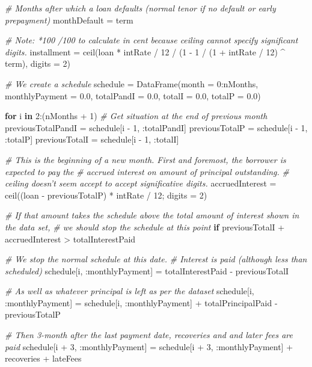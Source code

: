 \documentclass[11pt,]{report}
\newenvironment{Shaded}{\begin{snugshade}}{\end{snugshade}}
\newcommand{\CommentTok}[1]{\textcolor[rgb]{0.56,0.35,0.01}{\textit{#1}}}
\newcommand{\FloatTok}[1]{\textcolor[rgb]{0.00,0.00,0.81}{#1}}
\newcommand{\KeywordTok}[1]{\textcolor[rgb]{0.13,0.29,0.53}{\textbf{#1}}}
\newcommand{\NormalTok}[1]{#1}
\begin{document}
\begin{Shaded}
\begin{Highlighting}[numbers=left,,]
  \CommentTok{# Months after which a loan defaults (normal tenor if no default or early prepayment)}
\NormalTok{  monthDefault = term}

  \CommentTok{# Note: *100 /100 to calculate in cent because ceiling cannot specify significant digits.}
\NormalTok{  installment = ceil(loan * intRate / }\FloatTok{12}\NormalTok{ / (}\FloatTok{1}\NormalTok{ - }\FloatTok{1}\NormalTok{ / (}\FloatTok{1}\NormalTok{ + intRate / }\FloatTok{12}\NormalTok{) ^ term), digits = }\FloatTok{2}\NormalTok{)}

  \CommentTok{# We create a schedule}
\NormalTok{  schedule = DataFrame(month = }\FloatTok{0}\NormalTok{:nMonths, monthlyPayment = }\FloatTok{0.0}\NormalTok{, totalPandI = }\FloatTok{0.0}\NormalTok{, totalI = }\FloatTok{0.0}\NormalTok{, totalP = }\FloatTok{0.0}\NormalTok{)}

  \KeywordTok{for}\NormalTok{ i }\KeywordTok{in} \FloatTok{2}\NormalTok{:(nMonths + }\FloatTok{1}\NormalTok{)}
    \CommentTok{# Get situation at the end of previous month}
\NormalTok{    previousTotalPandI = schedule[i - }\FloatTok{1}\NormalTok{, :totalPandI]}
\NormalTok{    previousTotalP     = schedule[i - }\FloatTok{1}\NormalTok{, :totalP]}
\NormalTok{    previousTotalI     = schedule[i - }\FloatTok{1}\NormalTok{, :totalI]}

    \CommentTok{# This is the beginning of a new month. First and foremost, the borrower is expected to pay the}
    \CommentTok{# accrued interest on amount of principal outstanding.}
    \CommentTok{# ceiling doesn't seem accept to accept significative digits.}
\NormalTok{    accruedInterest = ceil((loan - previousTotalP) * intRate / }\FloatTok{12}\NormalTok{; digits = }\FloatTok{2}\NormalTok{)}

    \CommentTok{# If that amount takes the schedule above the total amount of interest shown in the data set,}
    \CommentTok{# we should stop the schedule at this point}
    \KeywordTok{if}\NormalTok{ previousTotalI + accruedInterest > totalInterestPaid}

      \CommentTok{# We stop the normal schedule at this date.}
      \CommentTok{# Interest is paid (although less than scheduled)}
\NormalTok{      schedule[i, :monthlyPayment] = totalInterestPaid - previousTotalI}

      \CommentTok{# As well as whatever principal is left as per the dataset}
\NormalTok{      schedule[i, :monthlyPayment] = schedule[i, :monthlyPayment] + totalPrincipalPaid - previousTotalP}

      \CommentTok{# Then 3-month after the last payment date, recoveries and and later fees are paid}
\NormalTok{      schedule[i + }\FloatTok{3}\NormalTok{, :monthlyPayment] = schedule[i + }\FloatTok{3}\NormalTok{, :monthlyPayment] + recoveries + lateFees}


\end{Highlighting}
\end{Shaded}
\end{document}
